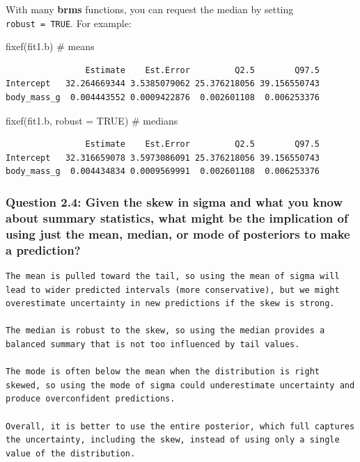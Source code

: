 \documentclass[
  letterpaper,
  DIV=11,
  numbers=noendperiod]{scrartcl}
\newenvironment{Shaded}{\begin{snugshade}}{\end{snugshade}}
\newcommand{\AttributeTok}[1]{\textcolor[rgb]{0.40,0.45,0.13}{#1}}
\newcommand{\CommentTok}[1]{\textcolor[rgb]{0.37,0.37,0.37}{#1}}
\newcommand{\ConstantTok}[1]{\textcolor[rgb]{0.56,0.35,0.01}{#1}}
\newcommand{\FunctionTok}[1]{\textcolor[rgb]{0.28,0.35,0.67}{#1}}
\newcommand{\NormalTok}[1]{\textcolor[rgb]{0.00,0.23,0.31}{#1}}
\begin{document}
With many \textbf{brms} functions, you can request the median by setting
\texttt{robust\ =\ TRUE}. For example:

\begin{Shaded}
\begin{Highlighting}[]
\FunctionTok{fixef}\NormalTok{(fit1.b)                 }\CommentTok{\# means}
\end{Highlighting}
\end{Shaded}

\begin{verbatim}
                Estimate    Est.Error         Q2.5        Q97.5
Intercept   32.264669344 3.5385079062 25.376218056 39.156550743
body_mass_g  0.004443552 0.0009422876  0.002601108  0.006253376
\end{verbatim}

\begin{Shaded}
\begin{Highlighting}[]
\FunctionTok{fixef}\NormalTok{(fit1.b, }\AttributeTok{robust =} \ConstantTok{TRUE}\NormalTok{)  }\CommentTok{\# medians}
\end{Highlighting}
\end{Shaded}

\begin{verbatim}
                Estimate    Est.Error         Q2.5        Q97.5
Intercept   32.316659078 3.5973086091 25.376218056 39.156550743
body_mass_g  0.004434834 0.0009569991  0.002601108  0.006253376
\end{verbatim}

\subsubsection{Question 2.4: Given the skew in sigma and what you know
about summary statistics, what might be the implication of using just
the mean, median, or mode of posteriors to make a
prediction?}\label{question-2.4-given-the-skew-in-sigma-and-what-you-know-about-summary-statistics-what-might-be-the-implication-of-using-just-the-mean-median-or-mode-of-posteriors-to-make-a-prediction}

\begin{verbatim}
The mean is pulled toward the tail, so using the mean of sigma will lead to wider predicted intervals (more conservative), but we might overestimate uncertainty in new predictions if the skew is strong.

The median is robust to the skew, so using the median provides a balanced summary that is not too influenced by tail values.

The mode is often below the mean when the distribution is right skewed, so using the mode of sigma could underestimate uncertainty and produce overconfident predictions.

Overall, it is better to use the entire posterior, which full captures the uncertainty, including the skew, instead of using only a single value of the distribution.
\end{verbatim}
\end{document}
